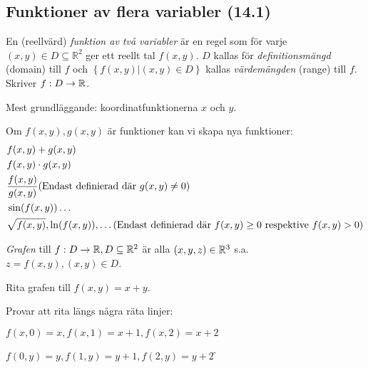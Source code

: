 \documentclass[a4paper]{article}
\begin{document}
\providecommand\fname{}
\renewcommand\fname{19-09-05}

\subsection{Funktioner av flera variabler (14.1)}
\begin{defn}
    En (reellvärd) \emph{funktion av två variabler} är en regel 
    som för varje \(
        (x,y) \in D \subseteq \mathbb{R}^2
    \) ger ett reellt tal \(
        f(x,y)
    \). \(
        D 
    \) kallas för \emph{definitionsmängd} (domain) till \(
        f
    \) och \(
        \left\{f(x,y) | (x,y) \in D\right\}
    \) kallas \emph{värdemängden} (range) till \(
        f
    \). Skriver \(
        f : D \to \mathbb{R}
    \). 
\end{defn}

\begin{ex}
    Mest grundläggande: koordinatfunktionerna \(
        x
    \) och \(
        y
    \).
\end{ex}

\begin{ex}
    Om \(
        f(x,y), g(x,y)
    \) är funktioner kan vi skapa nya funktioner: 
    \begin{align*}
        &f(x,y)+g(x,y) \\
        &f(x,y)\cdot g(x,y) \\
        &\displaystyle\frac{f(x,y)}{g(x,y)} (\text{Endast definierad där } g(x,y) \neq 0) \\
        &\sin(f(x,y))\dots \\
        &\sqrt{f(x,y)}, \ln(f(x,y)), \dots (\text{Endast definierad där } f(x,y) \geq 0 \text{ respektive }  f(x,y) > 0)
    \end{align*}
\end{ex}

\begin{defn}[Graf]
    \emph{Grafen} till \(
        f: D \to \mathbb{R}, D \subseteq \mathbb{R}^2
    \) är alla \(
        (x,y,z) \in \mathbb{R}^3
    \) s.a.\ \(
        z = f(x,y), (x,y) \in D
    \).
\end{defn}

\begin{ex}
    Rita grafen till \(
        f(x,y) = x+y
    \).

    Provar att rita längs några räta linjer:

    \(
        f(x,0) = x, f(x,1) = x+1, f(x,2) = x+2
    \) 

    \(
        f(0,y) = y, f(1,y) = y+1, f(2,y) = y+2
    \) 
    \f
\end{ex}
\end{document}
